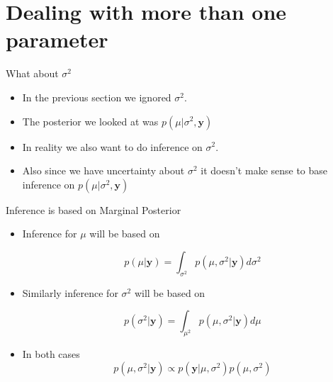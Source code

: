 \documentclass[10pt]{beamer}
\begin{document}
\section{Dealing with more than one parameter}
\begin{frame}{What about $\sigma^2$}
  \begin{itemize}
  \item In the previous section we ignored $\sigma^2$.

  \item The posterior we looked at was $p(\mu|\sigma^2,{\bm y})$

  \item In reality we also want to do inference on $\sigma^2$.

  \item Also since we have uncertainty about $\sigma^2$ it doesn't make sense to base inference on $p(\mu|\sigma^2,{\bm y})$
  \end{itemize}
\end{frame}
\begin{frame}{Inference is based on Marginal Posterior}
  \begin{itemize}
  \item Inference for $\mu$ will be based on

    \begin{equation}
      p(\mu|{\bm y})=\int_{\sigma^2}p(\mu,\sigma^2|{\bm y})d\sigma^2
    \end{equation}

  \item Similarly inference for $\sigma^2$ will be based on

    \begin{equation}
      p(\sigma^2|{\bm y})=\int_{\mu^2}p(\mu,\sigma^2|{\bm y})d\mu
    \end{equation}

  \item In both cases
    \begin{equation}
      p(\mu,\sigma^2|{\bm y})\propto p({\bm y}|\mu,\sigma^2)p(\mu,\sigma^2)
    \end{equation}
  \end{itemize}
\end{frame}
\end{document}
